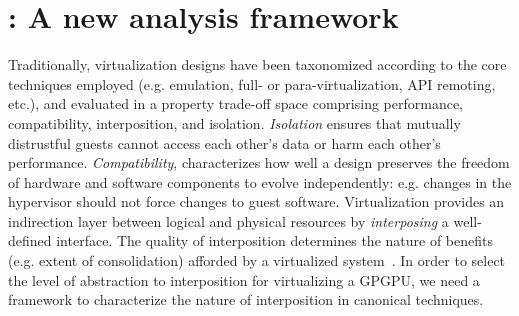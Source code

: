 \section{\iemts: A new analysis framework}

Traditionally, virtualization designs have been taxonomized according to the
core techniques employed (e.g. emulation, full- or para-virtualization, API
remoting, etc.), and evaluated in a property trade-off space comprising
performance, compatibility, interposition, and isolation. \emph{Isolation}
ensures that mutually distrustful guests cannot access each other's data or
harm each other's performance. \emph{Compatibility}, characterizes how well a
design preserves the freedom of hardware and software components to evolve
independently: e.g. changes in the hypervisor should not force changes to
guest software. Virtualization provides an indirection layer between
logical and physical resources by \emph{interposing} a well-defined interface.
The quality of interposition determines the nature of benefits (e.g. extent of
consolidation) afforded by a virtualized system~\cite{waldspurger12cacm}.
In order to select the level of abstraction to interposition for virtualizing
a GPGPU, we need a framework to characterize the nature of interposition in
canonical techniques.

